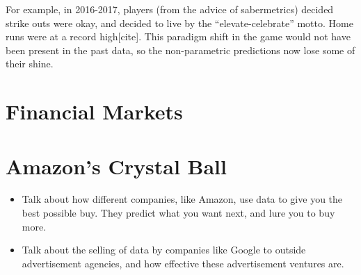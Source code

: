 \documentclass[12pt,twoside]{book}
\begin{document}
	For example, in 2016-2017, players (from the advice of sabermetrics) decided strike outs were okay, and decided to live by the ``elevate-celebrate'' motto.  Home runs were at a record high[cite].  This paradigm shift in the game would not have been present in the past data, so the non-parametric predictions now lose some of their shine.
	
	\chapter{Financial Markets}
	
	\chapter{Amazon's Crystal Ball}
	\begin{itemize}
		\item Talk about how different companies, like Amazon, use data to give you the best possible buy.  They predict what you want next, and lure you to buy more.
		\item Talk about the selling of data by companies like Google to outside advertisement agencies, and how effective these advertisement ventures are.
	\end{itemize}
\end{document}
